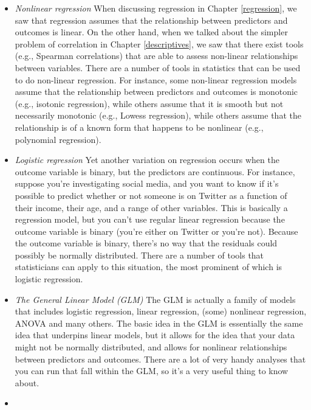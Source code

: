 \documentclass[
]{book}
\providecommand{\tightlist}{%
  \setlength{\itemsep}{0pt}\setlength{\parskip}{0pt}}
\begin{document}
\begin{itemize}
\tightlist
\item
  \emph{Nonlinear regression} When discussing regression in Chapter \ref{regression}, we saw that regression assumes that the relationship between predictors and outcomes is linear. On the other hand, when we talked about the simpler problem of correlation in Chapter \ref{descriptives}, we saw that there exist tools (e.g., Spearman correlations) that are able to assess non-linear relationships between variables. There are a number of tools in statistics that can be used to do non-linear regression. For instance, some non-linear regression models assume that the relationship between predictors and outcomes is monotonic (e.g., isotonic regression), while others assume that it is smooth but not necessarily monotonic (e.g., Lowess regression), while others assume that the relationship is of a known form that happens to be nonlinear (e.g., polynomial regression).
\item
  \emph{Logistic regression} Yet another variation on regression occurs when the outcome variable is binary, but the predictors are continuous. For instance, suppose you're investigating social media, and you want to know if it's possible to predict whether or not someone is on Twitter as a function of their income, their age, and a range of other variables. This is basically a regression model, but you can't use regular linear regression because the outcome variable is binary (you're either on Twitter or you're not). Because the outcome variable is binary, there's no way that the residuals could possibly be normally distributed. There are a number of tools that statisticians can apply to this situation, the most prominent of which is logistic regression.\\
\item
  \emph{The General Linear Model (GLM)} The GLM is actually a family of models that includes logistic regression, linear regression, (some) nonlinear regression, ANOVA and many others. The basic idea in the GLM is essentially the same idea that underpins linear models, but it allows for the idea that your data might not be normally distributed, and allows for nonlinear relationships between predictors and outcomes. There are a lot of very handy analyses that you can run that fall within the GLM, so it's a very useful thing to know about.\\
\item

\end{itemize}
\end{document}
